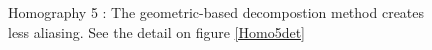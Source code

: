\begin{figure}
\caption{Homography 5 : The geometric-based decompostion method creates less aliasing. See the detail on figure \ref{Homo5det}}
\label{Homo5}
\end{figure}

